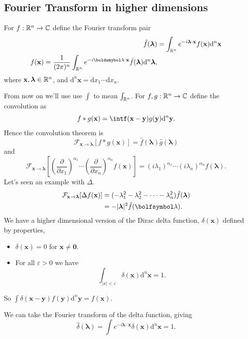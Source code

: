 \documentclass{article}
\begin{document}
\subsection{Fourier Transform in higher dimensions}
For $ f:\mathbb{R}^n\to \mathbb{C} $ define the Fourier transform pair 
\begin{align*}
	\hat f(\boldsymbol \lambda)&=\int_{\R^n} e^{-i\boldsymbol \lambda \cdot \mathbf x}f(\mathbf x)\mathrm d^n\mathbf x\\
	f(\mathbf x)=\frac 1{(2\pi)^n}\int_{\R^n}e^{-i\boldsmybol\lambda\cdot\mathbf x}\hat f(\boldsymbol \lambda )\mathrm d^n\boldsymbol \lambda,
\end{align*}
where $ \mathbf x,\boldsymbol \lambda\in\mathbb{R}^n $, and $ \mathrm d^n\mathbf x=\mathrm dx_1\cdots \mathrm d x_n. $\par
From now on we'll use use $ \int $ to mean $ \int_{\mathbb{R}^n} $. For $ f,g:\mathbb{R}^n\to \mathbb{C} $ define the convolution as
\[
  f*g(\mathbf x)=\intf(\mathbf x- \mathbf y)g(\mathbf y)\mathrm d^n\mathbf y.
\]
Hence the convolution theorem is
\[
	\mathcal F_{\mathbf x\to \boldsymbol \lambda}[f*g(\mathbf x)]=\hat f(\boldsymbol \lambda)\hat g(\boldsymbol \lambda)
\]
and
\[
	\mathcal F_{\mathbf x\to \boldsymbol\lambda}\left[\left(\frac{\partial }{\partial x_1}\right)^{\alpha_1}\cdots \left(\frac{\partial}{\partial x_n}\right)^{\alpha_n}f(\mathbf x)\right]=(i\lambda_1)^{\alpha_1}\cdots (i\lambda_n)^{\alpha_n}\hat f(\boldsymbol \lambda).
\]
Let's seen an example with $ \Delta $.
\begin{align*}
	\mathcal F_{\mathbf x\to\boldsymbol\lambda}[\Delta f(\mathbf x)] &=(-\lambda_1^2-\lambda_2^2-\dots-\lambda_n^2)\hat f(\boldsymbol \lambda) \\
									 &= -|\boldsymbol \lambda|^2\hat f(\bolfsymbol \lambda).
\end{align*}
We have a higher dimensional version of the Dirac delta function, $ \delta(\mathbf x) $ defined by properties,
\begin{itemize}
	\item $ \delta(\mathbf x)=0 $ for $ \mathbf x\ne \mathbf 0 $.
	\item For all $ \varepsilon>0 $ we have
		\[
			\int_{|x|<\varepsilon}\delta(\mathbf x)\mathrm d^n\mathbf x=1.
		\]
\end{itemize}
So $ \int\delta(\mathbf x-\mathbf y)f(\mathbf y)\mathrm d^n\mathbf y=f(\mathbf x) $.\par
We can take the Fourier transform of the delta function, giving
\[
	\hat \delta(\boldsymbol\lambda)=\int e^{-i\boldsymbol\lambda\cdot\mathbf x}\delta(\mathbf x)\mathrm d^n\mathbf x=1.
\]
\end{document}
